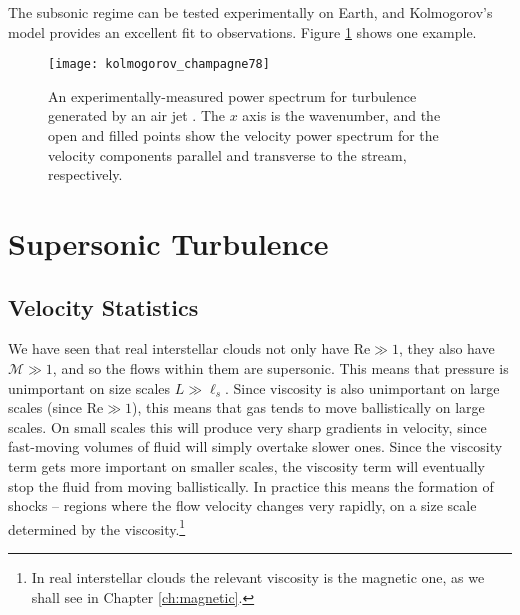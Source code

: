 The subsonic regime can be tested experimentally on Earth, and Kolmogorov's model provides an excellent fit to observations. Figure \ref{fig:kolmogorov} shows one example.

\begin{figure}
\texttt{[image: kolmogorov\_champagne78]}
\caption[Experimental power spectra for Kolmogorov turbulence]{
\label{fig:kolmogorov}
An experimentally-measured power spectrum for turbulence generated by an air jet \citep{champagne78a}. The $x$ axis is the wavenumber, and the open and filled points show the velocity power spectrum for the velocity components parallel and transverse to the stream, respectively.
}
\end{figure}

\section{Supersonic Turbulence}

\subsection{Velocity Statistics}

We have seen that real interstellar clouds not only have $\mathrm{Re} \gg 1$, they also have $\mathcal{M} \gg 1$, and so the flows within them are supersonic. This means that pressure is unimportant on size scales $L \gg \ell_s$. Since viscosity is also unimportant on large scales (since $\mbox{Re} \gg 1$), this means that gas tends to move ballistically on large scales. On small scales this will produce very sharp gradients in velocity, since fast-moving volumes of fluid will simply overtake slower ones. Since the viscosity term gets more important on smaller scales, the viscosity term will eventually stop the fluid from moving ballistically. In practice this means the formation of shocks -- regions where the flow velocity changes very rapidly, on a size scale determined by the viscosity.\footnote{In real interstellar clouds the relevant viscosity is the magnetic one, as we shall see in Chapter \ref{ch:magnetic}.}

